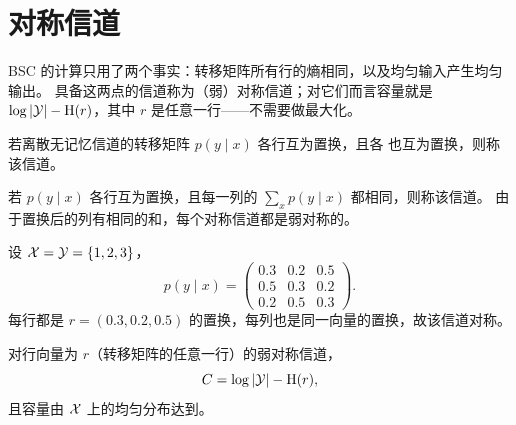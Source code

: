 \section{对称信道}\label{sec:symmetric}
\quad{}

\begin{strand}
BSC 的计算只用了两个事实：转移矩阵所有行的熵相同，以及均匀输入产生均匀输出。
具备这两点的信道称为（弱）对称信道；对它们而言容量就是 $\log|\mathcal{Y}|-\mathrm{H}(r)$，其中
$r$ 是任意一行——不需要做最大化。
\end{strand}



\begin{definition}[对称信道]\label{def:symmetric-channel}
若离散无记忆信道的转移矩阵 $p(y\mid x)$ 各行互为置换，且各
也互为置换，则称该信道。
\end{definition}

\begin{definition}[弱对称信道]\label{def:weakly-symmetric-channel}
若 $p(y\mid x)$ 各行互为置换，且每一列的
$\sum_{x}p(y\mid x)$ 都相同，则称该信道。
由于置换后的列有相同的和，每个对称信道都是弱对称的。
\end{definition}

\begin{example}[一个对称信道]\label{ex:symmetric-3x3}
设 $\mathcal{X}=\mathcal{Y}=\{1,2,3\}$，
\[
  p(y\mid x)=
  \begin{pmatrix}
    0.3 & 0.2 & 0.5\\
    0.5 & 0.3 & 0.2\\
    0.2 & 0.5 & 0.3
  \end{pmatrix}.
\]
每行都是 $r=(0.3,0.2,0.5)$ 的置换，每列也是同一向量的置换，故该信道对称。
\end{example}


\begin{theorem}[由对称性给出容量]\label{thm:symmetric-capacity}
对行向量为 $r$（转移矩阵的任意一行）的弱对称信道，
\[
  C=\log|\mathcal{Y}|-\mathrm{H}(r),
\]
且容量由 $\mathcal{X}$ 上的均匀分布达到。
\end{theorem}

